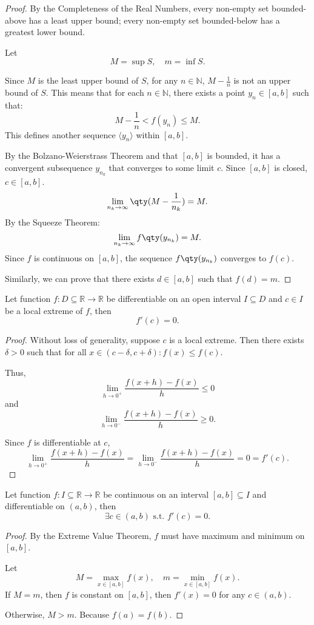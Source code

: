 \documentclass[a4paper,12pt]{report}
\begin{document}
\begin{itemize}
\begin{itemize}
\begin{proof}
By the Completeness of the Real Numbers, every non-empty set bounded-above has a least upper bound; every non-empty set bounded-below has a greatest lower bound.

Let
\[M=\sup S,\quad m=\inf S.\]

Since $M$ is the least upper bound of $S$, for any $n\in\mathbb{N}$, $M-\frac{1}{n}$ is not an upper bound of $S$. This means that for each $n\in\mathbb{N}$, there exists a point $y_n\in [a,b]$ such that:
\[M-\frac{1}{n}<f(y_n)\leq M.\]
This defines another sequence $\langle y_n\rangle$ within $[a, b]$.

By the Bolzano-Weierstrass Theorem and that $[a,b]$ is bounded, it has a convergent subsequence $y_{n_k}$ that converges to some limit $c$. Since $[a,b]$ is closed, $c\in [a,b]$.
\[\lim_{n_k\to \infty}\qty(M - \frac{1}{n_k}) = M.\]
By the Squeeze Theorem:
\[\lim_{n_k \to \infty} f\qty(y_{n_k}) = M.\]
Since $f$ is continuous on $[a,b]$, the sequence $f\qty(y_{n_k})$ converges to $f(c)$.

Similarly, we can prove that there exists $d\in [a,b]$ such that $f(d)=m$.
\end{proof}
Let function $f\colon D\subseteq\mathbb{R}\to\mathbb{R}$ be differentiable on an open interval $I\subseteq D$ and $c\in I$ be a local extreme of $f$, then
\[f'(c)=0.\]
\begin{proof}
Without loss of generality, suppose $c$ is a local extreme. Then there exists $\delta>0$ such that for all $x\in (c-\delta,c+\delta)\colon f(x)\leq f(c)$.

Thus,
\[\lim_{h\to 0^+}\frac{f(x+h)-f(x)}{h}\leq 0\]
and
\[\lim_{h\to 0^-}\frac{f(x+h)-f(x)}{h}\geq 0.\]

Since $f$ is differentiable at $c$,
\[\lim_{h\to 0^+}\frac{f(x+h)-f(x)}{h}=\lim_{h\to 0^-}\frac{f(x+h)-f(x)}{h}=0=f'(c).\]
\end{proof}
Let function $f\colon I\subseteq\mathbb{R}\to\mathbb{R}$ be continuous on an interval $[a, b]\subseteq I$ and differentiable on $(a,b)$, then
\[\exists c\in (a, b)\text{\ s.t.\ }f'(c)=0.\]
\begin{proof}
By the Extreme Value Theorem, $f$ must have maximum and minimum on $[a,b]$.

Let
\[M=\max_{x\in [a,b]}f(x),\quad m=\min_{x\in [a,b]}f(x).\]
If $M=m$, then $f$ is constant on $[a,b]$, then $f'(x)=0$ for any $c\in (a,b)$.

Otherwise, $M>m$. Because $f(a)=f(b)$. 


\end{proof}
\end{itemize}
\end{itemize}
\end{document}
